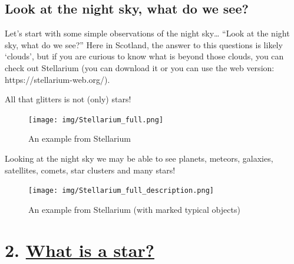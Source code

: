 \documentclass[
  letterpaper,
  DIV=11,
  numbers=noendperiod]{scrreprt}
\begin{document}
\hypertarget{look-at-the-night-sky-what-do-we-see-1}{%
\section*{Look at the night sky, what do we
see?}\label{look-at-the-night-sky-what-do-we-see-1}}


Let's start with some simple observations of the night sky\ldots{}
``Look at the night sky, what do we see?'' Here in Scotland, the answer
to this questions is likely `clouds', but if you are curious to know
what is beyond those clouds, you can check out Stellarium (you can
download it or you can use the web version:
https://stellarium-web.org/).

All that glitters is not (only) stars!

\begin{figure}

{\centering \texttt{[image: img/Stellarium\_full.png]}

}

\caption{An example from Stellarium}

\end{figure}

Looking at the night sky we may be able to see planets, meteors,
galaxies, satellites, comets, star clusters and many stars!

\begin{figure}

{\centering \texttt{[image: img/Stellarium\_full\_description.png]}

}

\caption{An example from Stellarium (with marked typical objects)}

\end{figure}


\hypertarget{what-is-a-star-1}{%
\chapter*{\texorpdfstring{2. \protect\hyperlink{toc0_}{What is a
star?}}{2. What is a star?}}\label{what-is-a-star-1}}

\end{document}
